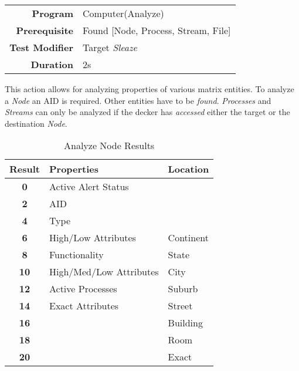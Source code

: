 \begin{tabular}{rl}
    \textbf{Program}       & Computer(Analyze)                   \\
    \textbf{Prerequisite}  & Found [Node, Process, Stream, File] \\
    \textbf{Test Modifier} & Target \emph{Sleaze}                \\
    \textbf{Duration}      & 2s                                  \\
\end{tabular}

\hfill

This action allows for analyzing properties of various matrix entities. To analyze a \emph{Node}
an AID is required. Other entities have to be \emph{found}. \emph{Processes} and \emph{Streams}
can only be analyzed if the decker has \emph{accessed} either the target or the destination
\emph{Node}.

\begin{table}[htb]
    \caption[Analyze Node Results]{Analyze Node Results}
    \label{tab:analyze results}
    \centering
    \begin{tabular}{cll}
        \toprule
        \textbf{Result} & \textbf{Properties}     & \textbf{Location} \\
        \midrule
        \textbf{0}      & Active Alert Status     &                   \\
        \textbf{2}      & AID                     &                   \\
        \textbf{4}      & Type                    &                   \\
        \textbf{6}      & High/Low Attributes     & Continent         \\
        \textbf{8}      & Functionality           & State             \\
        \textbf{10}     & High/Med/Low Attributes & City              \\
        \textbf{12}     & Active Processes        & Suburb            \\
        \textbf{14}     & Exact Attributes        & Street            \\
        \textbf{16}     &                         & Building          \\
        \textbf{18}     &                         & Room              \\
        \textbf{20}     &                         & Exact             \\
        \bottomrule
    \end{tabular}
\end{table}


